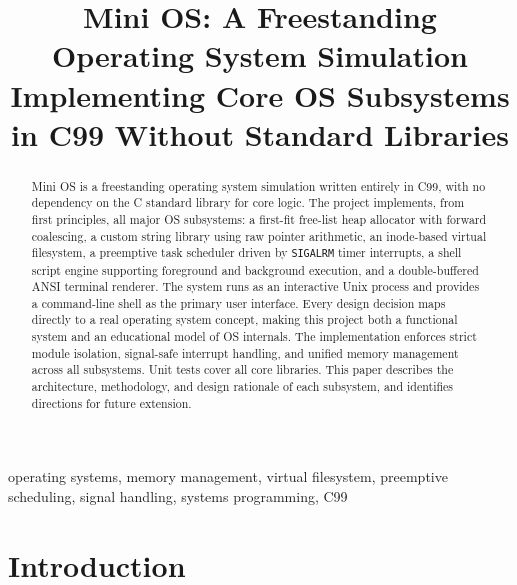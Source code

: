 \documentclass[conference]{IEEEtran}
\begin{document}
\title{Mini OS: A Freestanding Operating System Simulation\\
{\large Implementing Core OS Subsystems in C99 Without Standard Libraries}}

\author{
}

\maketitle

\begin{abstract}
Mini OS is a freestanding operating system simulation written entirely in C99, with no dependency on the C standard library for core logic. The project implements, from first principles, all major OS subsystems: a first-fit free-list heap allocator with forward coalescing, a custom string library using raw pointer arithmetic, an inode-based virtual filesystem, a preemptive task scheduler driven by \texttt{SIGALRM} timer interrupts, a shell script engine supporting foreground and background execution, and a double-buffered ANSI terminal renderer. The system runs as an interactive Unix process and provides a command-line shell as the primary user interface. Every design decision maps directly to a real operating system concept, making this project both a functional system and an educational model of OS internals. The implementation enforces strict module isolation, signal-safe interrupt handling, and unified memory management across all subsystems. Unit tests cover all core libraries. This paper describes the architecture, methodology, and design rationale of each subsystem, and identifies directions for future extension.
\end{abstract}

\begin{IEEEkeywords}
operating systems, memory management, virtual filesystem, preemptive scheduling, signal handling, systems programming, C99
\end{IEEEkeywords}

\section{Introduction}
\end{document}
